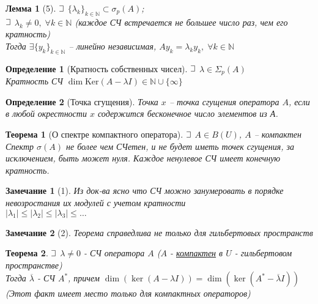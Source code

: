 \documentclass{article}
\theoremstyle{truestyle}
\newtheorem*{defenition}{Определение}
\newtheorem*{theorem}{Теорема}
\newtheorem*{lemma}{Лемма}
\newtheorem*{zam}{Замечание}
\newcommand{\Ker}{\text{Ker}}
\def\letus{%
	\mathord{\setbox0=\hbox{$\exists$}%
		\hbox{\kern 0.125\wd0%
			\vbox to \ht0{%
				\hrule width 0.75\wd0%
				\vfill%
				\hrule width 0.75\wd0}%
			\vrule height \ht0%
			\kern 0.125\wd0}%
	}%
}
\begin{document}
\begin{lemma}[5]
  $\letus$ $\{\lambda_k\}_{k \in \mathbb{N}} \subset \sigma_p(A)$;\\
  $\letus$ $\lambda_k \not = 0, \; \forall k \in \mathbb{N}$ (каждое СЧ встречается не большее число раз, чем его кратность)\\
  Тогда $\exists \{y_k\}_{k \in \mathbb{N}}$ -- линейно независимая, $Ay_k = \lambda_k y_k, \; \forall k \in \mathbb{N}$
\end{lemma}

\begin{defenition}[Кратность собственных чисел]
  $\letus$ $\lambda \in \Sigma_p(A)$\\
  Кратность СЧ $\dim\Ker(A - \lambda I) \in \mathbb{N} \cup \{\infty\}$
\end{defenition}

\begin{defenition}[Точка сгущения]
Точка $x$ -- точка сгущения оператора $A$,
если в любой окрестности $x$ содержится бесконечное число элементов из А.
\end{defenition}

\begin{theorem}[О спектре компактного оператора]
  $\letus$ $A \in B(U)$, $A$ -- компактен\\
  Спектр $\sigma(A)$ не более чем СЧетен, и не будет иметь точек сгущения, за исключением, быть может нуля.
  Каждое ненулевое СЧ имеет конечную кратность.
\end{theorem}

\begin{zam}[1]
  Из док-ва ясно что СЧ можно занумеровать в порядке невозростания их модулей с учетом кратности \\
  $|\lambda_1|\le|\lambda_2|\le|\lambda_3|\le \dots$
\end{zam}

\begin{zam}[2]
  Теорема справедлива не только для гильбертовых пространств
\end{zam}

\begin{theorem}
  $\letus$ $\lambda \not = 0$ - СЧ оператора $A$ ($A$ - \underline{компактен}  в $U$ - гильбертовом пространстве)\\
  Тогда $\overline{\lambda}$ - СЧ $A^*$, причем $\dim(\ker(A -\lambda I)) = \dim(\ker(A^*-\overline{\lambda}I))$
  (Этот факт имеет место только для компактных операторов)
\end{theorem}
\end{document}
